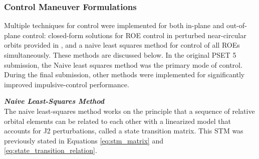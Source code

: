 \subsubsection{Control Maneuver Formulations}

Multiple techniques for control were implemented for both in-plane and out-of-plane control: closed-form solutions for ROE control in perturbed near-circular orbits provided in \cite{chernick2018new}, and a naive least squares method for control of all ROEs simultaneously. 
These methods are discussed below. In the original PSET 5 submission, the Naive least squares method was the primary mode of control. During the final submission, other methods were implemented for significantly improved impulsive-control performance.

\textit{\textbf{Naive Least-Squares Method}}\\
The naive least-squares method works on the principle that a sequence of relative orbital elements can be related to each other with a linearized model that accounts for J2 perturbations, called a state transition matrix. This STM was previously stated in Equations \ref{eq:stm_matrix} and \ref{eq:state_transition_relation}. 

